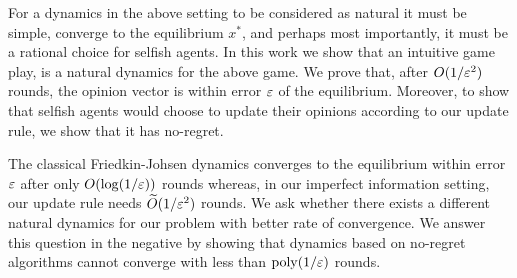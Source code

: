 For a dynamics in the above setting to be considered as natural it must be
simple, converge to the equilibrium $x^*$, and perhaps most importantly, it
must be a rational choice for selfish agents.  In this work we show that
an intuitive game play, is a natural dynamics for the above game.
We prove that, after $O(1/\varepsilon^2)$ rounds, the opinion vector
is within error $\varepsilon$  of the equilibrium. Moreover, to show that selfish
agents would choose to update their opinions according to our update rule,
we show that it has no-regret.


The classical Friedkin-Johsen dynamics converges to the equilibrium within
error $\varepsilon$ after only $O(\log(1/\varepsilon))$ rounds whereas, in our imperfect
information setting, our update rule needs $\widetilde{O}(1/\varepsilon^2)$ rounds.
We ask whether there exists a different natural dynamics for our problem
with better rate of convergence.  We answer this question in the negative
by showing that dynamics based on no-regret algorithms cannot converge with
less than $\mathrm{poly}(1/\varepsilon)$ rounds.


